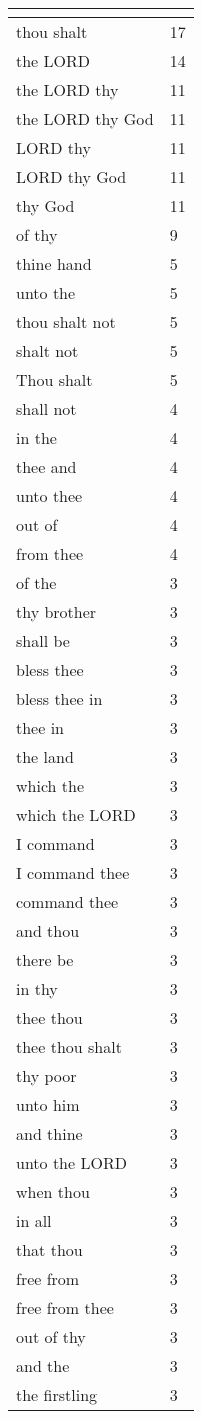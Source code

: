 \begin{center}
\begin{longtable}{|p{3.0in}|p{0.5in}|}
\hline \multicolumn{2}{c}{{ }} \\ \hline
\endfoot 
thou shalt & 17\\ \hline 
the LORD & 14\\ \hline 
the LORD thy & 11\\ \hline 
the LORD thy God & 11\\ \hline 
LORD thy & 11\\ \hline 
LORD thy God & 11\\ \hline 
thy God & 11\\ \hline 
of thy & 9\\ \hline 
thine hand & 5\\ \hline 
unto the & 5\\ \hline 
thou shalt not & 5\\ \hline 
shalt not & 5\\ \hline 
Thou shalt & 5\\ \hline 
shall not & 4\\ \hline 
in the & 4\\ \hline 
thee and & 4\\ \hline 
unto thee & 4\\ \hline 
out of & 4\\ \hline 
from thee & 4\\ \hline 
of the & 3\\ \hline 
thy brother & 3\\ \hline 
shall be & 3\\ \hline 
bless thee & 3\\ \hline 
bless thee in & 3\\ \hline 
thee in & 3\\ \hline 
the land & 3\\ \hline 
which the & 3\\ \hline 
which the LORD & 3\\ \hline 
I command & 3\\ \hline 
I command thee & 3\\ \hline 
command thee & 3\\ \hline 
and thou & 3\\ \hline 
there be & 3\\ \hline 
in thy & 3\\ \hline 
thee thou & 3\\ \hline 
thee thou shalt & 3\\ \hline 
thy poor & 3\\ \hline 
unto him & 3\\ \hline 
and thine & 3\\ \hline 
unto the LORD & 3\\ \hline 
when thou & 3\\ \hline 
in all & 3\\ \hline 
that thou & 3\\ \hline 
free from & 3\\ \hline 
free from thee & 3\\ \hline 
out of thy & 3\\ \hline 
and the & 3\\ \hline 
the firstling & 3\\ \hline 
\end{longtable}
\end{center}





